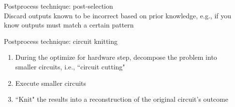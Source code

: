 \documentclass{article}
\newcommand{\ms}{\medskip}
\begin{document}
Postprocess technique: post-selection\\
Discard outputs known to be incorrect based on prior knowledge, e.g., if you know outputs must match a certain pattern\ms

Postprocess technique: circuit knitting
\begin{enumerate}
    \item During the optimize for hardware step, decompose the problem into \\smaller circuits, i.e., ``circuit cutting"
    \item Execute smaller circuits
    \item ``Knit" the results into a reconstruction of the original circuit's outcome
\end{enumerate}
\end{document}
